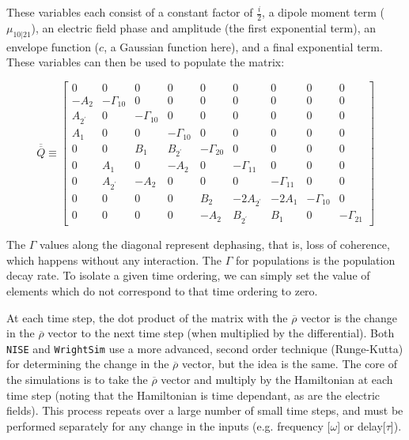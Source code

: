 \documentclass[fontsize=11pt]{scrartcl}
\numberwithin{equation}{section}		%
\numberwithin{figure}{section}			%
\numberwithin{table}{section}				%
\begin{document}
These variables each consist of a constant factor of $\frac{i}{2}$, a dipole moment term ($\mu_{10|21}$), an electric field phase and amplitude (the first exponential term), an envelope function ($c$, a Gaussian function here), and a final exponential term.
These variables can then be used to populate the matrix:

\begin{equation}
\overline{\overline{Q}} \equiv
\begin{bmatrix}
	0 & 0 & 0 & 0 & 0 & 0 & 0 & 0 & 0 \\
	-A_2 & -\Gamma_{10} & 0 & 0 & 0 & 0 & 0 & 0 & 0 \\
	A_{2^\prime} & 0 & -\Gamma_{10} & 0 & 0 & 0 & 0 & 0 & 0 \\
	A_1 & 0 & 0 & -\Gamma_{10} & 0 & 0 & 0 & 0 & 0 \\
	0 & 0 & B_1 & B_{2^\prime} & -\Gamma_{20} & 0 & 0 & 0 & 0 \\
	0 & A_1 & 0 & -A_2 & 0 & -\Gamma_{11} & 0 & 0 & 0 \\
	0 & A_{2^\prime} & -A_2 & 0 & 0 & 0 & -\Gamma_{11} & 0 & 0 \\
	0 & 0 & 0 & 0 & B_2 & -2A_{2^\prime} & -2A_1 & -\Gamma_{10} & 0 \\
	0 & 0 & 0 & 0 & -A_2 & B_{2^\prime} & B_1 & 0 & -\Gamma_{21}
\end{bmatrix}
\label{eq:single_Q}
\end{equation}

The $\Gamma$ values along the diagonal represent dephasing, that is, loss of coherence, which happens without any interaction.
The $\Gamma$ for populations is the population decay rate.
To isolate a given time ordering, we can simply set the value of elements which do not correspond to that time ordering to zero.

At each time step, the dot product of the matrix with the $\overline{\rho}$ vector is the change in the $\overline{\rho}$ vector to the next time step (when multiplied by the differential).
Both \texttt{NISE} and \texttt{WrightSim} use a more advanced, second order technique (Runge-Kutta) for determining the change in the $\overline{\rho}$ vector, but the idea is the same.
The core of the simulations is to take the $\overline{\rho}$ vector and multiply by the Hamiltonian at each time step (noting that the Hamiltonian is time dependant, as are the electric fields).
This process repeats over a large number of small time steps, and must be performed separately for any change in the inputs (e.g. frequency [$\omega$] or delay[$\tau$]).
\end{document}
